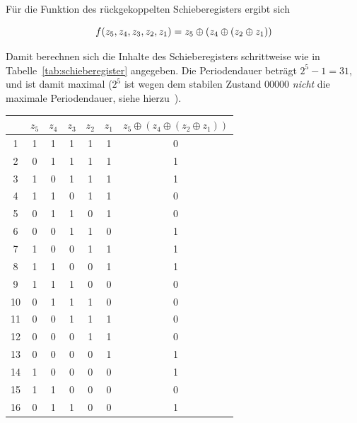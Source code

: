 \noindent
Für die Funktion des  rückgekoppelten Schieberegisters ergibt sich

\begin{equation}\notag
    f(z_5, z_4, z_3, z_2, z_1) = z_5 \oplus (z_4 \oplus (z_2 \oplus z_1))
\end{equation}


\noindent
Damit berechnen sich die Inhalte des Schieberegisters schrittweise wie in Tabelle~\ref{tab:schieberegister} angegeben.
Die Periodendauer beträgt $2^5 - 1 = 31$, und ist damit maximal ($2^5$ ist wegen dem stabilen Zustand $00000$ \textit{nicht} die maximale Periodendauer, siehe hierzu~\cite[\textbf{Lösung zu Aufgabe 6.2}, 111]{ITS3}).

\begin{table}[h!]
    \centering
    \setlength{\tabcolsep}{0.5em}
    \begin{tabular}{|c|c|c|c|c|c|c|}
        \hline
        \textbf{} & \textbf{$z_5$} & \textbf{$z_4$} & \textbf{$z_3$} & \textbf{$z_2$} & \textbf{$z_1$} & \textbf{$z_5 \oplus (z_4 \oplus (z_2 \oplus z_1))$} \\
        \hline
        1 &  1 & 1 & 1 & 1 & 1 & 0 \\
        \hline
        2 &  0 & 1 & 1 & 1 & 1 & 1 \\
        \hline
        3 &  1 & 0 & 1 & 1 & 1 & 1 \\
        \hline
        4 &  1 & 1 & 0 & 1 & 1 & 0 \\
        \hline
        5 &  0 & 1 & 1 & 0 & 1 & 0 \\
        \hline
        6 &  0 & 0 & 1 & 1 & 0 & 1 \\
        \hline
        7 &  1 & 0 & 0 & 1 & 1 & 1 \\
        \hline
        8 &  1 & 1 & 0 & 0 & 1 & 1 \\
        \hline
        9 &  1 & 1 & 1 & 0 & 0 & 0 \\
        \hline
        10 &  0 & 1 & 1 & 1 & 0 & 0 \\
        \hline
        11 &  0 & 0 & 1 & 1 & 1 & 0 \\
        \hline
        12 &  0 & 0 & 0 & 1 & 1 & 0 \\
        \hline
        13 &  0 & 0 & 0 & 0 & 1 & 1 \\
        \hline
        14 &  1 & 0 & 0 & 0 & 0 & 1 \\
        \hline
        15 &  1 & 1 & 0 & 0 & 0 & 0\\
        \hline
        16 &  0 & 1 & 1 & 0 & 0 & 1 \\

\end{tabular}
\end{table}

